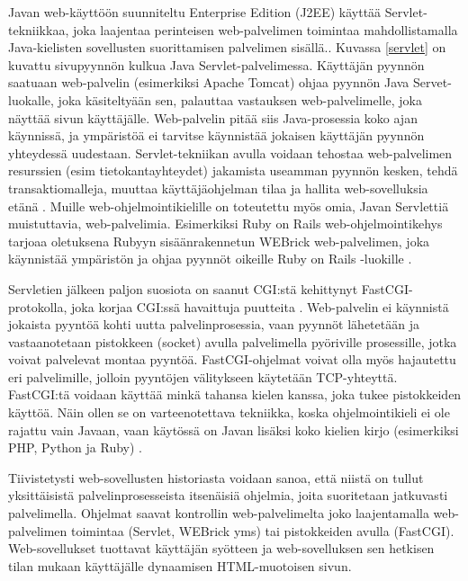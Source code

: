 Javan web-käyttöön suunniteltu Enterprise Edition (J2EE) käyttää Servlet-tekniikkaa, joka laajentaa perinteisen web-palvelimen toimintaa mahdollistamalla Java-kielisten sovellusten suorittamisen palvelimen sisällä.. Kuvassa \ref{servlet} on kuvattu sivupyynnön kulkua Java Servlet-palvelimessa. Käyttäjän pyynnön saatuaan web-palvelin (esimerkiksi Apache Tomcat) ohjaa pyynnön Java Servet-luokalle, joka käsiteltyään sen, palauttaa vastauksen web-palvelimelle, joka näyttää sivun käyttäjälle. Web-palvelin pitää siis Java-prosessia koko ajan käynnissä, ja ympäristöä ei tarvitse käynnistää jokaisen käyttäjän pyynnön yhteydessä uudestaan. Servlet-tekniikan avulla voidaan tehostaa web-palvelimen resurssien (esim tietokantayhteydet) jakamista useamman pyynnön kesken, tehdä transaktiomalleja, muuttaa käyttäjäohjelman tilaa ja hallita web-sovelluksia etänä \cite{uml}. Muille web-ohjelmointikielille on toteutettu myös omia, Javan Servlettiä muistuttavia, web-palvelimia. Esimerkiksi Ruby on Rails web-ohjelmointikehys tarjoaa oletuksena Rubyyn sisäänrakennetun WEBrick web-palvelimen, joka käynnistää ympäristön ja ohjaa pyynnöt oikeille Ruby on Rails -luokille \cite{ruby2011agile}.

Servletien jälkeen paljon suosiota on saanut CGI:stä kehittynyt FastCGI-protokolla, joka korjaa CGI:ssä havaittuja puutteita \cite{fastcgi}. Web-palvelin ei käynnistä jokaista pyyntöä kohti uutta palvelinprosessia, vaan pyynnöt lähetetään ja vastaanotetaan pistokkeen (socket) avulla palvelimella pyöriville prosessille, jotka voivat palvelevat montaa pyyntöä. FastCGI-ohjelmat voivat olla myös hajautettu eri palvelimille, jolloin pyyntöjen välitykseen käytetään TCP-yhteyttä. FastCGI:tä voidaan käyttää minkä tahansa kielen kanssa, joka tukee pistokkeiden käyttöä. Näin ollen se on varteenotettava tekniikka, koska ohjelmointikieli ei ole rajattu vain Javaan, vaan käytössä on Javan lisäksi koko kielien kirjo (esimerkiksi PHP, Python ja Ruby) \cite{fastcgi}.

Tiivistetysti web-sovellusten historiasta voidaan sanoa, että niistä on tullut yksittäisistä palvelinprosesseista itsenäisiä ohjelmia, joita suoritetaan jatkuvasti palvelimella. Ohjelmat saavat kontrollin web-palvelimelta joko laajentamalla web-palvelimen toimintaa (Servlet, WEBrick yms) tai pistokkeiden avulla (FastCGI). Web-sovellukset tuottavat käyttäjän syötteen ja web-sovelluksen sen hetkisen tilan mukaan käyttäjälle dynaamisen HTML-muotoisen sivun.
